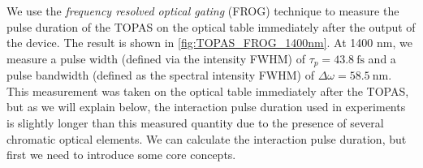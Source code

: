 We use the \textit{frequency resolved optical gating} (FROG) technique \cite{kaneCharacterizationArbitraryFemtosecond1993} to measure the pulse duration of the TOPAS on the optical table immediately after the output of the device. The result is shown in \cref{fig:TOPAS_FROG_1400nm}. At 1400 nm, we measure a pulse width (defined via the intensity FWHM) of $\tau_p = 43.8 \ \textrm{fs}$ and a pulse bandwidth (defined as the spectral intensity FWHM) of $\Delta \omega = 58.5 \ \textrm{nm}$. This measurement was taken on the optical table immediately after the TOPAS, but as we will explain below, the interaction pulse duration used in experiments is slightly longer than this measured quantity due to the presence of several chromatic optical elements. We can calculate the interaction pulse duration, but first we need to introduce some core concepts.

